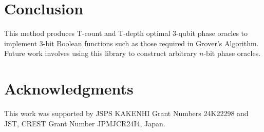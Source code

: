 \documentclass[a4paper]{article}
\begin{document}
\section{Conclusion}
\label{Sec:concl}

This method produces T-count and T-depth optimal 3-qubit phase oracles to implement 3-bit Boolean functions
such as those required in Grover's Algorithm. Future work involves using this library to construct arbitrary
$n$-bit phase oracles.

\section*{Acknowledgments}                                                     
This work was supported by JSPS KAKENHI Grant Numbers 24K22298 and JST, CREST Grant Number JPMJCR24I4, Japan.




\end{document}
